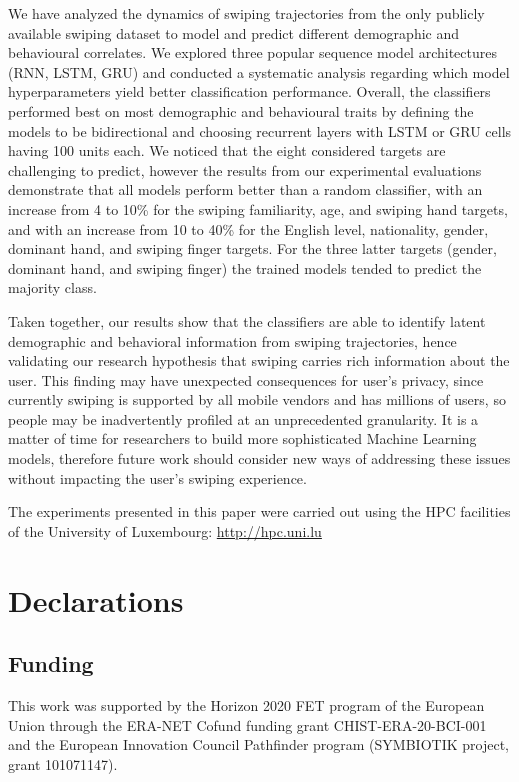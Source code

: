 \documentclass[sn-mathphys, pdflatex]{sn-jnl}
\newcommand{\rev}[1]{#1}
\begin{document}
We have analyzed the dynamics of swiping trajectories from the only publicly available swiping dataset
to model and predict different demographic and behavioural correlates.
We explored three popular sequence model architectures (RNN, LSTM, GRU)
and conducted a systematic analysis regarding which model hyperparameters yield better classification performance.
Overall, the classifiers performed best on most demographic and behavioural traits
by defining the models to be bidirectional and choosing recurrent layers with LSTM or GRU cells \rev{having 100 units each}.
\rev{We noticed that the eight considered targets are challenging to predict, however}
the results from our experimental evaluations demonstrate that all models perform better than a random classifier,
with an increase from 4 to 10\% for the swiping familiarity, age, and swiping hand targets,
and with an increase from 10 to 40\% for the English level, nationality, gender, dominant hand, and swiping finger targets.
\rev{For the three latter targets (gender, dominant hand, and swiping finger)
the trained models tended to predict the majority class.}

Taken together, our results show that the classifiers are able to identify latent demographic and behavioral information from swiping trajectories,
hence validating our research hypothesis that swiping carries rich information about the user.
This \rev{finding} may have unexpected consequences for user's privacy,
since currently swiping is supported by all mobile vendors and has millions of users,
so people may be inadvertently profiled at an unprecedented granularity.
\rev{It is a matter of time for researchers to build more sophisticated Machine Learning models, therefore}
future work should consider new ways of addressing these issues without impacting the user's swiping experience.

\backmatter

The experiments presented in this paper were carried out
using the HPC facilities of the University of Luxembourg: \url{http://hpc.uni.lu}

\section*{Declarations}

\subsection*{Funding}
This work was supported by the Horizon 2020 FET program of the European Union through the ERA-NET Cofund funding grant CHIST-ERA-20-BCI-001 and the European Innovation Council Pathfinder program (SYMBIOTIK project, grant 101071147).
\end{document}
